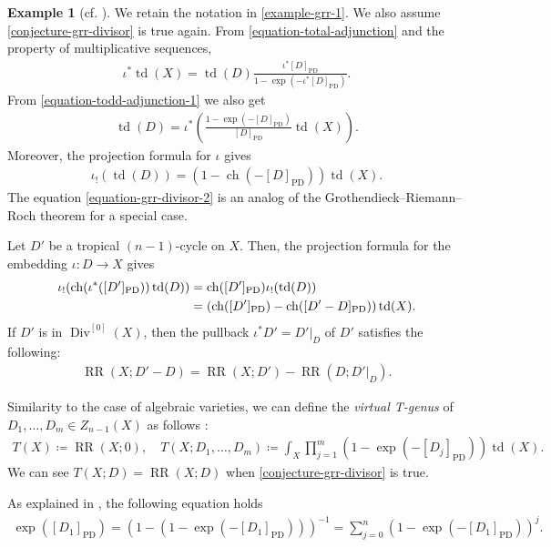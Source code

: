 \documentclass[a4paper,dvipdfmx,reqno,12pt]{amsart}
\theoremstyle{definition}
\newtheorem{example}[theorem]{Example}
\newcommand{\deq}{\coloneqq}
\newcommand{\opn}[1]{\operatorname{#1}}
\newcommand{\PD}[1]{[#1]_{\mathrm{PD}}}
\numberwithin{equation}{section}
\begin{document}
\begin{example}[{cf. \cite[Chapter 13 Appendix]{MR2810322}}]
\label{example-sum-formula}
We retain the notation
in \cref{example-grr-1}.
We also assume \cref{conjecture-grr-divisor} is true again.
From \eqref{equation-total-adjunction}
and the property of multiplicative sequences, 
\begin{align}
\label{equation-todd-adjunction-1}
\iota^{*}\opn{td}(X)=
\opn{td}(D)\frac{\iota^{*}\PD{D}}
{1-\opn{exp}(-\iota^{*}\PD{D})}.
\end{align}
From \cref{equation-todd-adjunction-1} we also get
\begin{align}
\opn{td}(D)
=\iota^{*}\left(
\frac{1-\opn{exp}(-\PD{D})}{
\PD{D}}\opn{td}(X)\right).
\end{align}
Moreover, the projection formula for 
$\iota$ gives
\begin{align}
\label{equation-grr-divisor-2}
\iota_!(\opn{td}(D))=(1-\opn{ch}(-\PD{D}))\opn{td}(X).
\end{align}
The equation \eqref{equation-grr-divisor-2} 
is an analog of 
the Grothendieck--Riemann--Roch theorem
for a special case.

Let $D'$ be a tropical $(n-1)$-cycle on $X$.
Then, the projection formula for 
the embedding $\iota\colon D\to X$ gives
\begin{align}
\iota_!(\opn{ch}(\iota^{*}(\PD{D'}))\opn{td}(D))
&=\opn{ch}(\PD{D'})\iota_!(\opn{td}(D)) \notag \\
&=(\opn{ch}(\PD{D'})-\opn{ch}(\PD{D'-D}))\opn{td}(X).
\end{align}
If $D'$ is in $\opn{Div}^{[0]}(X)$, then
the pullback $\iota^{*}D'=D'|_{D}$ of $D'$ satisfies
the following:
\begin{align}
\label{equation-rr-number-divisor}
\opn{RR}(X;D'-D)=\opn{RR}(X;D')-
\opn{RR}(D;D'|_{D}).
\end{align}


Similarity to the case of algebraic varieties,
we can define the
\emph{virtual T-genus} of $D_1,\ldots,D_m\in Z_{n-1}(X)$
as follows \cite[]{MR1335917}:
\begin{align}
T(X)\deq \opn{RR}(X;0),\quad  T(X;D_1,\ldots,D_m)\deq
\int_X\prod_{j=1}^{m}(1-\opn{exp}(-\PD{D_j}))\opn{td}(X).
\end{align}
We can see $T(X;D)=\opn{RR}(X;D)$ when
\cref{conjecture-grr-divisor} is true.


As explained in \cite[]{MR1335917},
the following equation holds
\begin{align}
\opn{exp}(\PD{D_1})=(1-(1-\opn{exp}(-\PD{D_1})))^{-1}
=\sum_{j=0}^{n}(1-\opn{exp}(-\PD{D_1}))^j.
\end{align}


\end{example}
\end{document}
